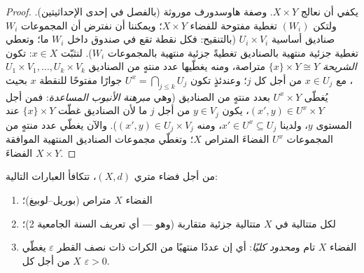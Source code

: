 \begin{proof}
يكفي أن نعالج $X \times Y$. وصفة هاوسدورف موروثة (بالفصل في
إحدى الإحداثيتين). ولتكن $(W_i)$ تغطية مفتوحة للفضاء $X
\times Y$؛
ويمكننا أن نفترض أن المجموعات $W_i$ صناديق أساسية $U_i \times
V_i$
(بالتنقيح: فكل نقطة تقع في صندوق داخل $W_i$ ما؛ وتعطي تغطية
جزئية منتهية بالصناديق تغطيةً جزئية منتهية بالمجموعات $W_i$).
لنثبّت $x \in X$: تكون \emph{الشريحة} $\{x\}\times Y \cong Y$ متراصة، ومنه
يغطّيها عدد منتهٍ من الصناديق $U_1\times V_1, \dots, U_k\times V_k$، مع $x \in U_j$ من أجل كل
$j$؛ وعندئذٍ تكون $U^x = \bigcap_{j \leq k} U_j$ جوارًا مفتوحًا للنقطة $x$ بحيث يُغطّى
$U^x \times Y$ بعدد منتهٍ من الصناديق (وهي \emph{مبرهنة الأنبوب
المساعدة}: فمن أجل $(x', y) \in U^x \times Y$، يكون
$y \in V_j$ من أجل $j$ ما لأن الصناديق غطّت $\{x\}\times Y$ عند
المستوى $y$، ولدينا $x' \in U^x \subseteq U_j$، ومنه $(x', y) \in U_j
\times V_j$). والآن يغطّي عدد منتهٍ
من المجموعات $U^x$ الفضاءَ المتراص $X$؛ وتغطّي مجموعات الصناديق
المنتهية الموافقة الفضاءَ $X \times Y$.
\end{proof}

\begin{theorem}
\label{thm:b3:topology:metriccompact}
من أجل فضاء متري $(X, d)$، تتكافأ العبارات التالية:
\begin{enumerate}
  \item الفضاء $X$ متراص (بوريل--لوبيغ)؛
  \item لكل متتالية في $X$ متتالية جزئية متقاربة (وهو  --- أي تعريف السنة الجامعية 2)؛
  \item الفضاء $X$ تام و\emph{محدود كليًا}: أي إن عددًا منتهيًا
        من الكرات ذات نصف القطر $\varepsilon$ يغطّي $X$ من أجل
        كل $\varepsilon > 0$.
\end{enumerate}
\end{theorem}

